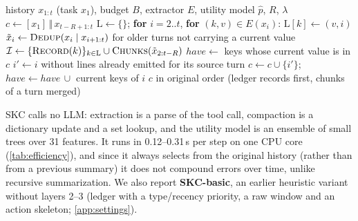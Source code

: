 \begin{algorithm}[t]
\caption{State-Keyed Compaction (SKC)}
\label{alg:skc}
\small
\begin{algorithmic}[1]
\Require history $x_{1:t}$ (task $x_1$), budget $B$, extractor $E$, utility model $\hat p$, $R$, $\lambda$
\State $c \gets [x_1] \,\Vert\, x_{t-R+1:t}$ 
\State $\mathrm{L} \gets \{\}$; \textbf{for} $i=2..t$, \textbf{for} $(k,v)\in E(x_i)$: $\mathrm{L}[k]\gets(v,i)$ 
\State $\tilde x_i \gets \textsc{Dedup}(x_i \mid x_{i+1:t})$ for older turns not carrying a current value 
\State $\mathcal{I} \gets \{\textsc{Record}(k)\}_{k\in \mathrm{L}} \cup \textsc{Chunks}(\tilde x_{2:t-R})$
\State $\mathit{have} \gets$ keys whose current value is in $c$
 
  \State $i' \gets i$ without lines already emitted for its source turn 
    \State $c\gets c\cup\{i'\}$; $\mathit{have}\gets \mathit{have}\,\cup$ current keys of $i$
  \EndIf
\EndFor
\State \Return $c$ in original order (ledger records first, chunks of a turn merged)
\end{algorithmic}
\end{algorithm}

SKC calls no LLM: extraction is a parse of the tool call, compaction is a
dictionary update and a set lookup, and the utility model is an ensemble of small
trees over 31 features. It runs in 0.12--0.31\,s per step on one CPU core (\cref{tab:efficiency}),
and since it always selects from the original history (rather than from a
previous summary) it does not compound errors over time, unlike recursive
summarization. We also report \textbf{SKC-basic}, an earlier
heuristic variant without layers 2--3 (ledger with a type/recency priority, a
raw window and an action skeleton; \cref{app:settings}).
